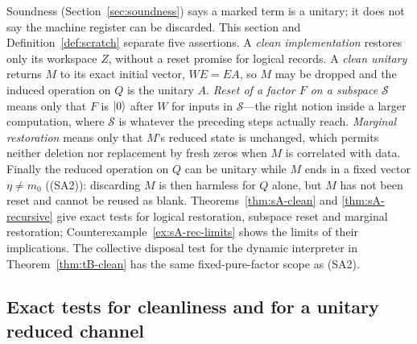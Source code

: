 Soundness (Section~\ref{sec:soundness}) says a marked term is a unitary;
it does not say the machine register can be discarded. This section and
Definition~\ref{def:scratch} separate five assertions. A \emph{clean
implementation} restores only its workspace $Z$, without a reset promise
for logical records. A \emph{clean unitary} returns $M$ to its exact
initial vector, $WE=EA$, so $M$ may be dropped and the induced operation
on $Q$ is the unitary $A$. \emph{Reset of a factor $F$ on a subspace
$\mathcal S$} means only that $F$ is $\lvert 0\rangle$ after $W$ for inputs in
$\mathcal S$---the right notion inside a larger computation, where
$\mathcal S$ is whatever the preceding steps actually reach.
\emph{Marginal restoration} means only that $M$'s reduced state is
unchanged, which permits neither deletion nor replacement by fresh zeros
when $M$ is correlated with data. Finally the reduced operation on $Q$
can be unitary while $M$ ends in a fixed vector $\eta\neq m_0$ ((SA2)):
discarding $M$ is then harmless for $Q$ alone, but $M$ has not been reset
and cannot be reused as blank. Theorems~\ref{thm:sA-clean} and
\ref{thm:sA-recursive} give exact tests for logical restoration, subspace
reset and marginal restoration; Counterexample~\ref{ex:sA-rec-limits}
shows the limits of their implications. The collective disposal test for
the dynamic interpreter in Theorem~\ref{thm:tB-clean} has the same
fixed-pure-factor scope as (SA2).

\subsection{Exact tests for cleanliness and for a unitary reduced channel}

